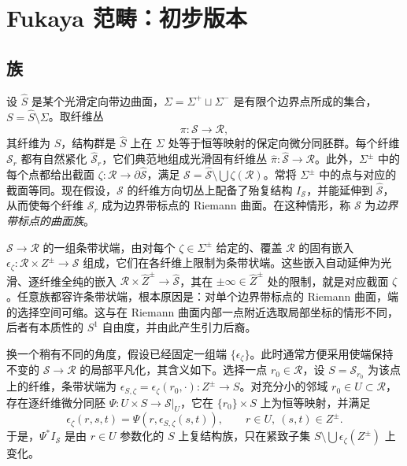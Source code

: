 \section{Fukaya 范畴：初步版本}\label{sec:9}
\subsection{族}\label{sec:9a}
\begin{definition*}
设 $\widehat S$ 是某个光滑定向带边曲面，$\Sigma=\Sigma^+\sqcup\Sigma^-$ 是有限个边界点所成的集合，$S=\widehat S\setminus\Sigma$。取纤维丛
\[
\pi:\mathcal S\longrightarrow\mathcal R,
\]
其纤维为 $S$，结构群是 $\widehat S$ 上在 $\Sigma$ 处等于恒等映射的保定向微分同胚群。每个纤维 $\mathcal S_r$ 都有自然紧化 $\widehat{\mathcal S}_r$，它们典范地组成光滑固有纤维丛 $\widehat\pi:\widehat{\mathcal S}\to\mathcal R$。此外，$\Sigma^\pm$ 中的每个点都给出截面 $\zeta:\mathcal R\to\partial\widehat{\mathcal S}$，满足 $\mathcal S=\widehat{\mathcal S}\setminus\bigcup\zeta(\mathcal R)$。常将 $\Sigma^\pm$ 中的点与对应的截面等同。现在假设，$\mathcal S$ 的纤维方向切丛上配备了殆复结构 $I_{\mathcal S}$，并能延伸到 $\widehat{\mathcal S}$，从而使每个纤维 $\mathcal S_r$ 成为边界带标点的 Riemann 曲面。在这种情形，称 $\mathcal S$ 为\emph{边界带标点的曲面族}。
\end{definition*}

$\mathcal S\to\mathcal R$ 的一组条带状端，由对每个 $\zeta\in\Sigma^\pm$ 给定的、覆盖 $\mathcal R$ 的固有嵌入 $\epsilon_\zeta:\mathcal R\times Z^\pm\to\mathcal S$ 组成，它们在各纤维上限制为条带状端。这些嵌入自动延伸为光滑、逐纤维全纯的嵌入 $\mathcal R\times\widehat Z^\pm\to\widehat{\mathcal S}$，其在 $\pm\infty\in\widehat Z^\pm$ 处的限制，就是对应截面 $\zeta$。任意族都容许条带状端，根本原因是：对单个边界带标点的 Riemann 曲面，端的选择空间可缩。这与在 Riemann 曲面内部一点附近选取局部坐标的情形不同，后者有本质性的 $S^1$ 自由度，并由此产生引力后裔。

换一个稍有不同的角度，假设已经固定一组端 $\{\epsilon_\zeta\}$。此时通常方便采用使端保持不变的 $\mathcal S\to\mathcal R$ 的局部平凡化，其含义如下。选择一点 $r_0\in\mathcal R$，设 $S=\mathcal S_{r_0}$ 为该点上的纤维，条带状端为 $\epsilon_{S,\zeta}=\epsilon_\zeta(r_0,\cdot):Z^\pm\to S$。对充分小的邻域 $r_0\in U\subset\mathcal R$，存在逐纤维微分同胚 $\Psi:U\times S\to\mathcal S|_U$，它在 $\{r_0\}\times S$ 上为恒等映射，并满足
\begin{equation}\label{eq:9.1}
\epsilon_\zeta(r,s,t)=\Psi(r,\epsilon_{S,\zeta}(s,t)),\qquad r\in U,\ (s,t)\in Z^\pm.
\end{equation}
于是，$\Psi^*I_{\mathcal S}$ 是由 $r\in U$ 参数化的 $S$ 上复结构族，只在紧致子集 $S\setminus\bigcup\epsilon_\zeta(Z^\pm)$ 上变化。

